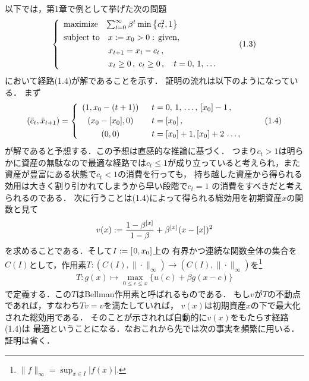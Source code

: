 \documentclass[a4paper,11pt]{jsarticle}
\DeclareRobustCommand{\lfrac}[2]{{\lower.4ex\hbox{\begingroup\ensuremath{#1}\endgroup}\over{\hspace{.2mm}#2\hspace{.2mm}}}}
\begin{document}
\vspace{7mm}

以下では，第1章で例として挙げた次の問題
\begin{align}
	\left\{
		\begin{array}{l}
			\mathrm{maximize} \hspace{3mm} \sum_{t=0}^\infty \beta^t \min \left\{c_t^2,1\right\} \vspace{1.4mm}\\
			\mathrm{subject}\hspace{1.2mm}\mathrm{to}\quad x:=x_0 > 0 :\, \mathrm{given},
			\vspace{1.4mm}\\
			\hspace{18.9mm}x_{t+1}=x_t-c_t\,,\vspace{1.4mm}\\
			\hspace{18.9mm}x_t \geq 0\,,\;c_t\geq 0\,,\quad t=0,\,1,\,\ldots
		\end{array}
        \right.\tag{1.3}
\end{align}
において経路(1.4)が解であることを示す．
証明の流れは以下のようになっている．
まず
\belowdisplayskip=4mm
\begin{align}
	(\bar{c}_t,\bar{x}_{t+1})=\left\{
			\begin{array}{cl}
				(1,x_0-(t+1)) &\;\; t=0,\,1,\,\ldots,\,[x_0]-1\,,\vspace{1.4mm}\\
				(x_0-[x_0],0) &\;\; t=[x_0]\,,\vspace{1.4mm}\\
				(0,0)	&\;\; t=[x_0]+1,[x_0]+2\,\ldots,\,
			\end{array}
		\right.\tag{1.4}
\end{align}
が解であると予想する．この予想は直感的な推論に基づく．
つまり$c_t>1$は明らかに資産の無駄なので最適な経路では$c_t\leq 1$が成り立っていると考えられ，また資産が豊富にある状態で$c_t<1$の消費を行っても，
持ち越した資産から得られる効用は大きく割り引かれてしまうから早い段階で$c_t= 1$
の消費をすべきだと考えられるのである．
次に行うことは(1.4)によって得られる総効用を初期資産$x$の関数と見て
\belowdisplayskip=3.2mm
\begin{align*}
	v(x):=\lfrac{1-\beta^{[x]}}{1-\beta}+\beta^{[x]}\hspace*{.2mm}(x-[x])^2
\end{align*}
を求めることである．そして$I:=[\hspace{.3mm}0,x_0\hspace{.1mm}]$上の
有界かつ連続な関数全体の集合を$C(I)$として，作用素$T:(C(I),\|\cdot\|_\infty)\to (C(I),\|\cdot\|_\infty)$を\footnote{$\|f\|_{\infty}=\sup_{x \in I}|f(x)|$.}
\begin{align*}
	T:g(x) \mapsto \max_{0\leq c \leq x}\{u(c)+\beta g(x-c)\}
\end{align*}
で定義する．この$T$はBellman作用素と呼ばれるものである．
もし$v$が$T$の不動点であれば，すなわち$Tv=v$を満たしていれば，
$v(x)$は初期資産$x$の下で最大化された総効用である．
そのことが示されれば自動的に$v(x)$をもたらす経路(1.4)は
最適ということになる．なおこれから先では次の事実を頻繁に用いる．証明は省く．
\end{document}
